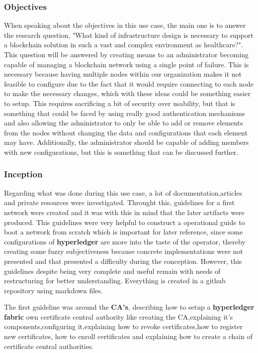 \subsubsection{Objectives}
When speaking about the objectives in this use case, the main one is to answer the research question, 
"What kind of infrastructure design is necessary to support a blockchain solution in such a vast and complex environment as healthcare?". 
This question will be answered by creating means to an administrator becoming capable of managing a blockchain network using a single 
point of failure. This is necessary because having multiple nodes within our organization makes it not feasible to configure due to the 
fact that it would require connecting to each node to make the necessary changes, which with these ideas could be something easier to setup. 
This requires sacrificing a bit of security over usability, but that is something that could be faced by using really good authentication 
mechanisms and also allowing the administrator to only be able to add or remove elements from the nodes without changing the data and 
configurations that each element may have. Additionally, the administrator should be capable of adding members with new configurations, 
but this is something that can be discussed further.

\subsubsection{Inception}
Regarding what was done during this use case, a lot of documentation,articles and private resources were investigated. Throught this,
guidelines for a first network were created and it was with this in mind that the later artifacts were produced. This guidelines were 
very helpful to construct a operational guide to boot a network from scratch which is important for later reference, 
since some configurations of \textbf{hyperledger} are more into the taste of the operator, thereby creating some fuzzy subjectiveness 
because concrete implementations were not presented and that presented a difficulty during the conception.  However, this guidelines 
despite being very complete and useful remain with needs of restructuring for better understanding. Everything is created in a github 
repository using markdown files.

The first guideline was around the \textbf{CA's}, describing how to setup a \textbf{hyperledger fabric} own certificate central authority 
like creating the CA,explaining it's components,configuring it,explaining how to revoke certificates,how to register new certificates, how 
to enroll certificates and explaining how to create a chain of certificate central authorities.

